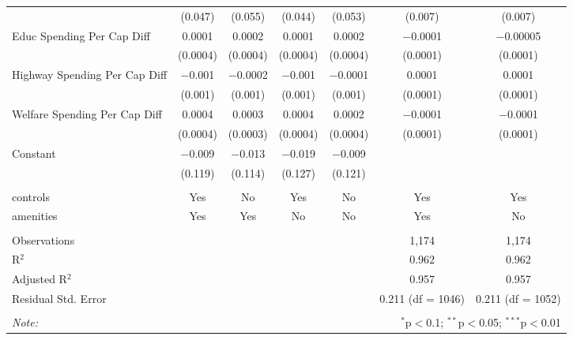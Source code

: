 \begin{table}[!htbp]
\begin{tabular}{@{\extracolsep{5pt}}lcccccc}
  & (0.047) & (0.055) & (0.044) & (0.053) & (0.007) & (0.007) \\ 
  Educ Spending Per Cap Diff & 0.0001 & 0.0002 & 0.0001 & 0.0002 & $-$0.0001 & $-$0.00005 \\ 
  & (0.0004) & (0.0004) & (0.0004) & (0.0004) & (0.0001) & (0.0001) \\ 
  Highway Spending Per Cap Diff & $-$0.001 & $-$0.0002 & $-$0.001 & $-$0.0001 & 0.0001 & 0.0001 \\ 
  & (0.001) & (0.001) & (0.001) & (0.001) & (0.0001) & (0.0001) \\ 
  Welfare Spending Per Cap Diff & 0.0004 & 0.0003 & 0.0004 & 0.0002 & $-$0.0001 & $-$0.0001 \\ 
  & (0.0004) & (0.0003) & (0.0004) & (0.0004) & (0.0001) & (0.0001) \\ 
  Constant & $-$0.009 & $-$0.013 & $-$0.019 & $-$0.009 &  &  \\ 
  & (0.119) & (0.114) & (0.127) & (0.121) &  &  \\ 
 \hline \\[-1.8ex] 
controls & Yes & No & Yes & No & Yes & Yes \\ 
amenities & Yes & Yes & No & No & Yes & No \\ 
\hline \\[-1.8ex] 
Observations &  &  &  &  & 1,174 & 1,174 \\ 
R$^{2}$ &  &  &  &  & 0.962 & 0.962 \\ 
Adjusted R$^{2}$ &  &  &  &  & 0.957 & 0.957 \\ 
Residual Std. Error &  &  &  &  & 0.211 (df = 1046) & 0.211 (df = 1052) \\ 
\hline 
\hline \\[-1.8ex] 
\textit{Note:}  & \multicolumn{6}{r}{$^{*}$p$<$0.1; $^{**}$p$<$0.05; $^{***}$p$<$0.01} \\ 
\end{tabular} 
\end{table} 
